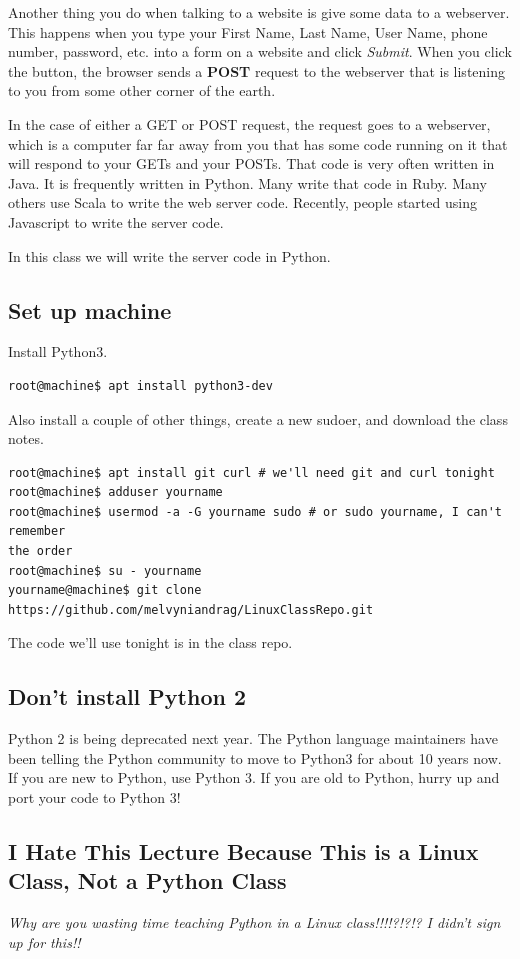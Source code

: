 \documentclass[10pt]{article}
\begin{document}
Another thing you do when talking to a website is give some data to a webserver. This happens when you type your First Name, Last Name, User Name, phone number, password, etc. into a form on a website and click \textit{Submit}. When you click the button, the browser sends a \textbf{POST} request to the webserver that is listening to you from some other corner of the earth. 

In the case of either a GET or POST request, the request goes to a webserver, which is a computer far far away from you that has some code running on it that will respond to your GETs and your POSTs. That code is very often written in Java. It is frequently written in Python. Many write that code in Ruby. Many others use Scala to write the web server code. Recently, people started using Javascript to write the server code. 

In this class we will write the server code in Python.

\subsection{Set up machine}

Install Python3.

\begin{lstlisting}
root@machine$ apt install python3-dev
\end{lstlisting}

Also install a couple of other things, create a new sudoer, and download the class
notes.
\begin{lstlisting}
root@machine$ apt install git curl # we'll need git and curl tonight
root@machine$ adduser yourname
root@machine$ usermod -a -G yourname sudo # or sudo yourname, I can't remember
the order
root@machine$ su - yourname
yourname@machine$ git clone https://github.com/melvyniandrag/LinuxClassRepo.git
\end{lstlisting}

The code we'll use tonight is in the class repo.

\subsection{Don't install Python 2}
Python 2 is being deprecated next year. The Python language maintainers have been telling the Python community to move to Python3 for about 10 years now. If you are new to Python, use Python 3. If you are old to Python, hurry up and port your code to Python 3!

\subsection{I Hate This Lecture Because This is a Linux Class, Not a Python Class}
\textit{Why are you wasting time teaching Python in a Linux class!!!!?!?!? I didn't sign up for this!!}
\end{document}
